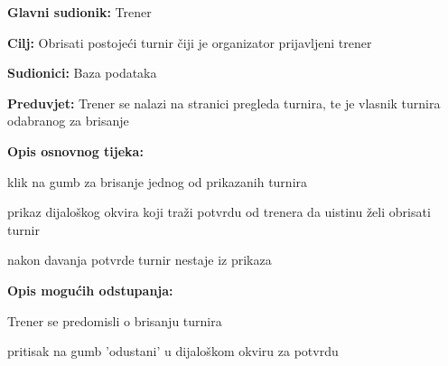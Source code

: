 					\noindent {}
					\begin{packed_item}
	
						\item \textbf{Glavni sudionik: }Trener
						\item  \textbf{Cilj: } Obrisati postojeći turnir čiji je organizator prijavljeni trener
						\item  \textbf{Sudionici: } Baza podataka
						\item  \textbf{Preduvjet: } Trener se nalazi na stranici pregleda turnira, te je vlasnik turnira odabranog za brisanje
						\item  \textbf{Opis osnovnog tijeka:}
						
						\item[] \begin{packed_enum}
	
							\item klik na gumb za brisanje jednog od prikazanih turnira
							\item prikaz dijaloškog okvira koji traži potvrdu od trenera da uistinu želi obrisati turnir
							\item nakon davanja potvrde turnir nestaje iz prikaza
							
						\end{packed_enum}
						
						\item  \textbf{Opis mogućih odstupanja:}
						
						\item[] \begin{packed_item}
	
							\item Trener se predomisli o brisanju turnira
							\item[] \begin{packed_enum}
								
								\item pritisak na gumb 'odustani' u dijaloškom okviru za potvrdu
								
							\end{packed_enum}
							
						\end{packed_item}
					\end{packed_item}
					
